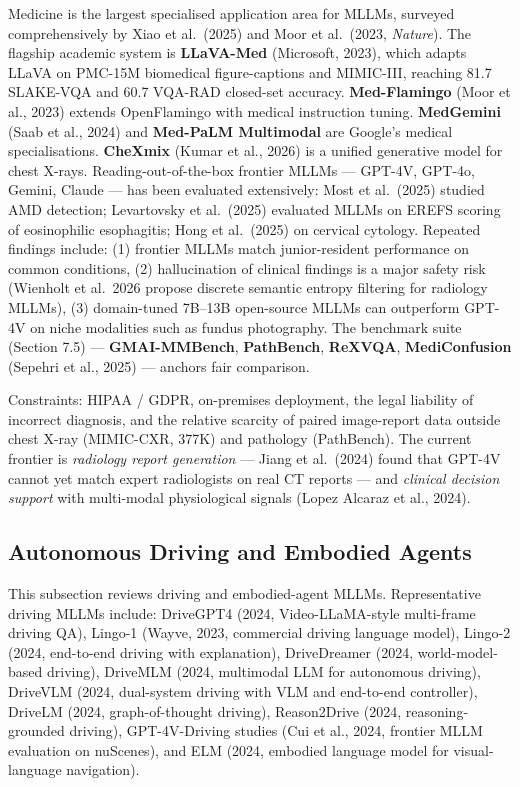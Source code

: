 Medicine is the largest specialised application area for MLLMs, surveyed comprehensively by Xiao et al.~(2025) and Moor et al.~(2023, \emph{Nature}). The flagship academic system is \textbf{LLaVA-Med} (Microsoft, 2023), which adapts LLaVA on PMC-15M biomedical figure-captions and MIMIC-III, reaching 81.7 SLAKE-VQA and 60.7 VQA-RAD closed-set accuracy. \textbf{Med-Flamingo} (Moor et al., 2023) extends OpenFlamingo with medical instruction tuning. \textbf{MedGemini} (Saab et al., 2024) and \textbf{Med-PaLM Multimodal} are Google's medical specialisations. \textbf{CheXmix} (Kumar et al., 2026) is a unified generative model for chest X-rays. Reading-out-of-the-box frontier MLLMs --- GPT-4V, GPT-4o, Gemini, Claude --- has been evaluated extensively: Most et al.~(2025) studied AMD detection; Levartovsky et al.~(2025) evaluated MLLMs on EREFS scoring of eosinophilic esophagitis; Hong et al.~(2025) on cervical cytology. Repeated findings include: (1) frontier MLLMs match junior-resident performance on common conditions, (2) hallucination of clinical findings is a major safety risk (Wienholt et al.~2026 propose discrete semantic entropy filtering for radiology MLLMs), (3) domain-tuned 7B--13B open-source MLLMs can outperform GPT-4V on niche modalities such as fundus photography. The benchmark suite (Section 7.5) --- \textbf{GMAI-MMBench}, \textbf{PathBench}, \textbf{ReXVQA}, \textbf{MediConfusion} (Sepehri et al., 2025) --- anchors fair comparison.

Constraints: HIPAA / GDPR, on-premises deployment, the legal liability of incorrect diagnosis, and the relative scarcity of paired image-report data outside chest X-ray (MIMIC-CXR, 377K) and pathology (PathBench). The current frontier is \emph{radiology report generation} --- Jiang et al.~(2024) found that GPT-4V cannot yet match expert radiologists on real CT reports --- and \emph{clinical decision support} with multi-modal physiological signals (Lopez Alcaraz et al., 2024).

\subsection{Autonomous Driving and Embodied Agents}\label{autonomous-driving-and-embodied-agents}

This subsection reviews driving and embodied-agent MLLMs. Representative driving MLLMs include: DriveGPT4 (2024, Video-LLaMA-style multi-frame driving QA), Lingo-1 (Wayve, 2023, commercial driving language model), Lingo-2 (2024, end-to-end driving with explanation), DriveDreamer (2024, world-model-based driving), DriveMLM (2024, multimodal LLM for autonomous driving), DriveVLM (2024, dual-system driving with VLM and end-to-end controller), DriveLM (2024, graph-of-thought driving), Reason2Drive (2024, reasoning-grounded driving), GPT-4V-Driving studies (Cui et al., 2024, frontier MLLM evaluation on nuScenes), and ELM (2024, embodied language model for visual-language navigation).

